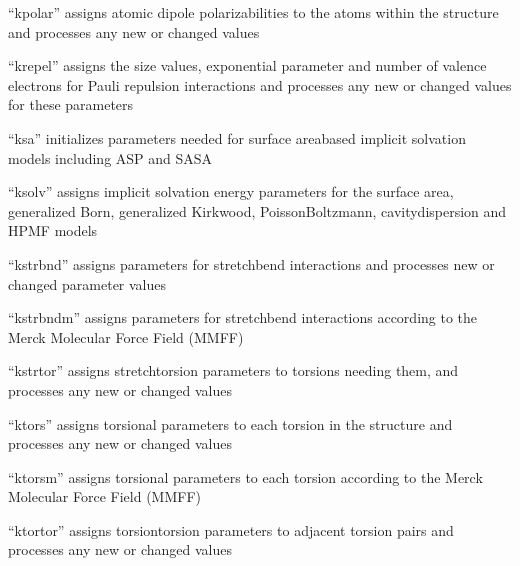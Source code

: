 \documentclass[letterpaper,11pt,english]{sphinxmanual}
\begin{document}

“kpolar” assigns atomic dipole polarizabilities to the atoms
within the structure and processes any new or changed values


“krepel” assigns the size values, exponential parameter and
number of valence electrons for Pauli repulsion interactions
and processes any new or changed values for these parameters


“ksa” initializes parameters needed for surface area\sphinxhyphen{}based
implicit solvation models including ASP and SASA


“ksolv” assigns implicit solvation energy parameters for
the surface area, generalized Born, generalized Kirkwood,
Poisson\sphinxhyphen{}Boltzmann, cavity\sphinxhyphen{}dispersion and HPMF models


“kstrbnd” assigns parameters for stretch\sphinxhyphen{}bend interactions
and processes new or changed parameter values


“kstrbndm” assigns parameters for stretch\sphinxhyphen{}bend interactions
according to the Merck Molecular Force Field (MMFF)


“kstrtor” assigns stretch\sphinxhyphen{}torsion parameters to torsions
needing them, and processes any new or changed values


“ktors” assigns torsional parameters to each torsion in
the structure and processes any new or changed values


“ktorsm” assigns torsional parameters to each torsion according
to the Merck Molecular Force Field (MMFF)


“ktortor” assigns torsion\sphinxhyphen{}torsion parameters to adjacent
torsion pairs and processes any new or changed values

\end{document}
